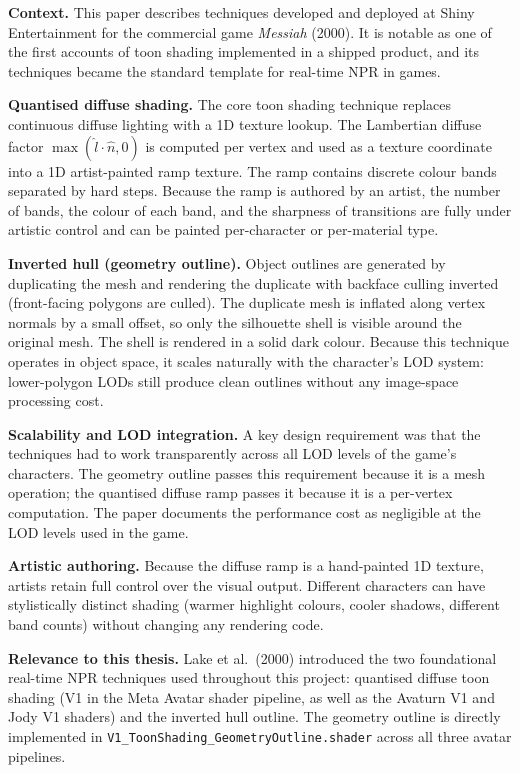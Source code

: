 \documentclass[11pt, a4paper]{article}
\begin{document}
\textbf{Context.} This paper describes techniques developed and deployed at Shiny Entertainment for the commercial game \textit{Messiah} (2000). It is notable as one of the first accounts of toon shading implemented in a shipped product, and its techniques became the standard template for real-time NPR in games.

\textbf{Quantised diffuse shading.} The core toon shading technique replaces continuous diffuse lighting with a 1D texture lookup. The Lambertian diffuse factor $\max(\hat{l} \cdot \hat{n}, 0)$ is computed per vertex and used as a texture coordinate into a 1D artist-painted ramp texture. The ramp contains discrete colour bands separated by hard steps. Because the ramp is authored by an artist, the number of bands, the colour of each band, and the sharpness of transitions are fully under artistic control and can be painted per-character or per-material type.

\textbf{Inverted hull (geometry outline).} Object outlines are generated by duplicating the mesh and rendering the duplicate with backface culling inverted (front-facing polygons are culled). The duplicate mesh is inflated along vertex normals by a small offset, so only the silhouette shell is visible around the original mesh. The shell is rendered in a solid dark colour. Because this technique operates in object space, it scales naturally with the character's LOD system: lower-polygon LODs still produce clean outlines without any image-space processing cost.

\textbf{Scalability and LOD integration.} A key design requirement was that the techniques had to work transparently across all LOD levels of the game's characters. The geometry outline passes this requirement because it is a mesh operation; the quantised diffuse ramp passes it because it is a per-vertex computation. The paper documents the performance cost as negligible at the LOD levels used in the game.

\textbf{Artistic authoring.} Because the diffuse ramp is a hand-painted 1D texture, artists retain full control over the visual output. Different characters can have stylistically distinct shading (warmer highlight colours, cooler shadows, different band counts) without changing any rendering code.

\textbf{Relevance to this thesis.} Lake et al.\ (2000) introduced the two foundational real-time NPR techniques used throughout this project: quantised diffuse toon shading (V1 in the Meta Avatar shader pipeline, as well as the Avaturn V1 and Jody V1 shaders) and the inverted hull outline. The geometry outline is directly implemented in \texttt{V1\_ToonShading\_GeometryOutline.shader} across all three avatar pipelines.
\end{document}
